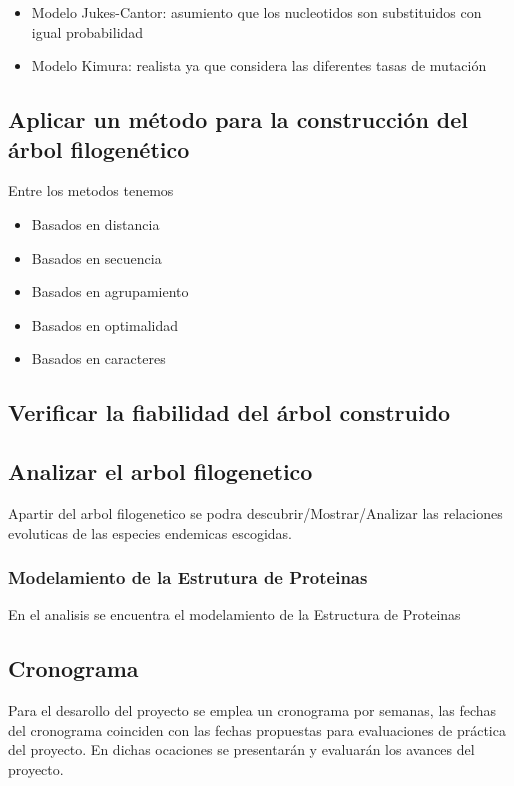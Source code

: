 \documentclass[a4paper]{article}
\begin{document}
\begin{itemize}
\item Modelo Jukes-Cantor: asumiento que los nucleotidos son substituidos con igual probabilidad
\item Modelo Kimura: realista ya que considera las diferentes tasas de mutación
\end{itemize}
\subsection{Aplicar un método para la construcción del árbol filogenético}	
Entre los metodos tenemos 
\begin{itemize}
	\item Basados en distancia
	\item Basados en secuencia
	\item Basados en agrupamiento
	\item Basados en optimalidad
	\item Basados en caracteres
\end{itemize}

\subsection{Verificar la fiabilidad del árbol construido}

\subsection{Analizar el arbol filogenetico}
Apartir del arbol filogenetico se podra descubrir/Mostrar/Analizar las relaciones evoluticas de las especies endemicas escogidas.
\subsubsection{Modelamiento de la Estrutura de Proteinas}
En el analisis se encuentra el modelamiento de la Estructura de Proteinas

\subsection{Cronograma}
Para el desarollo del proyecto se emplea un cronograma por semanas, las fechas del cronograma coinciden con las fechas propuestas para evaluaciones de práctica del proyecto. En dichas ocaciones se presentarán y evaluarán los avances del proyecto.
\end{document}
